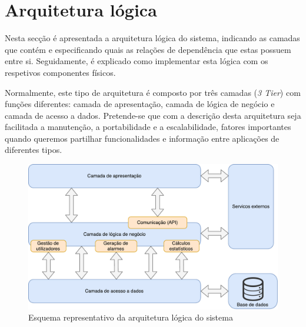 

\newpage
\section{Arquitetura lógica}

Nesta secção é apresentada a arquitetura lógica do sistema, indicando as camadas que contém e especificando quais as relações de dependência que estas possuem entre si. Seguidamente, é explicado como implementar esta lógica com os respetivos componentes físicos. 

Normalmente, este tipo de arquitetura é composto por três camadas (\textit{3 Tier})\cite{Josuttis2001} com funções diferentes: camada de apresentação, camada de lógica de negócio e camada de acesso a dados. Pretende-se que com a descrição desta arquitetura seja facilitada a manutenção, a portabilidade e a
escalabilidade, fatores importantes quando queremos partilhar funcionalidades e informação entre aplicações de diferentes tipos.


\begin{figure}[!htb]
	\centering
	\includegraphics[scale = 0.6]{esquemas/arquitetura-logica.pdf}
	\caption{Esquema representativo da arquitetura lógica do sistema }
	\label{logicaarqu}
\end{figure}

